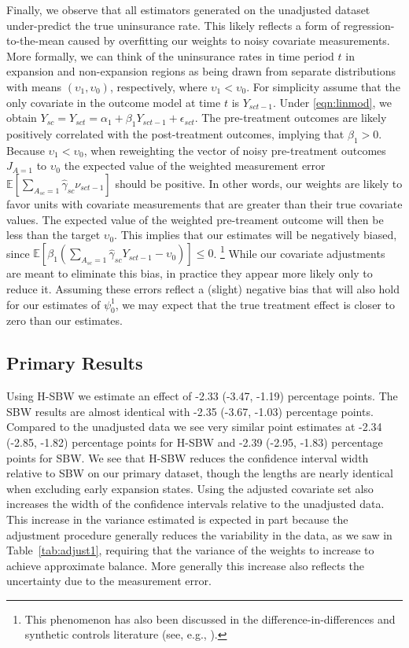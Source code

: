 \documentclass[aoas]{imsart}
\theoremstyle{plain}
\theoremstyle{remark}
\begin{document}
Finally, we observe that all estimators generated on the unadjusted dataset under-predict the true uninsurance rate. This likely reflects a form of regression-to-the-mean caused by overfitting our weights to noisy covariate measurements. More formally, we can think of the uninsurance rates in time period $t$ in expansion and non-expansion regions as being drawn from separate distributions with means $(\upsilon_1, \upsilon_0)$, respectively, where $\upsilon_1 < \upsilon_0$. For simplicity assume that the only covariate in the outcome model at time $t$ is $Y_{sct-1}$. Under \eqref{eqn:linmod}, we obtain $Y_{sc} = Y_{sct} = \alpha_1 + \beta_1Y_{sct-1} + \epsilon_{sct}$. The pre-treatment outcomes are likely positively correlated with the post-treatment outcomes, implying that $\beta_1 > 0$. Because $\upsilon_1 < \upsilon_0$, when reweighting the vector of noisy pre-treatment outcomes $J_{A=1}$ to $\upsilon_0$ the expected value of the weighted measurement error $\mathbb{E}[\sum_{A_{sc} = 1}\hat{\gamma}_{sc}\nu_{sct-1}]$ should be positive. In other words, our weights are likely to favor units with covariate measurements that are greater than their true covariate values. The expected value of the weighted pre-treament outcome will then be less than the target $\upsilon_0$. This implies that our estimates will be negatively biased, since $\mathbb{E}[\beta_1(\sum_{A_{sc} = 1}\hat{\gamma}_{sc}Y_{sct-1} - \upsilon_0)] \le 0$. \footnote{This phenomenon has also been discussed in the difference-in-differences and synthetic controls literature (see, e.g., \cite{daw2018matching}).} While our covariate adjustments are meant to eliminate this bias, in practice they appear more likely only to reduce it. Assuming these errors reflect a (slight) negative bias that will also hold for our estimates of $\psi^1_0$, we may expect that the true treatment effect is closer to zero than our estimates. 

\subsection{Primary Results}

Using H-SBW we estimate an effect of -2.33 (-3.47, -1.19) percentage points. The SBW results are almost identical with -2.35 (-3.67, -1.03) percentage points. Compared to the unadjusted data we see very similar point estimates at -2.34 (-2.85, -1.82) percentage points for H-SBW and -2.39 (-2.95, -1.83) percentage points for SBW. We see that H-SBW reduces the confidence interval width relative to SBW on our primary dataset, though the lengths are nearly identical when excluding early expansion states. Using the adjusted covariate set also increases the width of the confidence intervals relative to the unadjusted data. This increase in the variance estimated is expected in part because the adjustment procedure generally reduces the variability in the data, as we saw in Table~\ref{tab:adjust1}, requiring that the variance of the weights to increase to achieve approximate balance. More generally this increase also reflects the uncertainty due to the measurement error.
\end{document}
